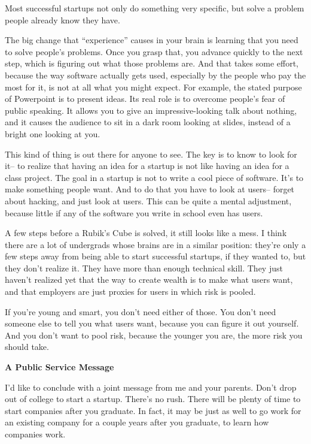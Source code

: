 \documentclass[12pt]{book}
\begin{document}
Most successful startups not only do something very specific, but solve
a problem people already know they have.

The big change that ``experience'' causes in your brain is learning that
you need to solve people's problems. Once you grasp that, you advance
quickly to the next step, which is figuring out what those problems are.
And that takes some effort, because the way software actually gets used,
especially by the people who pay the most for it, is not at all what you
might expect. For example, the stated purpose of Powerpoint is to
present ideas. Its real role is to overcome people's fear of public
speaking. It allows you to give an impressive-looking talk about
nothing, and it causes the audience to sit in a dark room looking at
slides, instead of a bright one looking at you.

This kind of thing is out there for anyone to see. The key is to know to
look for it-- to realize that having an idea for a startup is not like
having an idea for a class project. The goal in a startup is not to
write a cool piece of software. It's to make something people want. And
to do that you have to look at users-- forget about hacking, and just
look at users. This can be quite a mental adjustment, because little if
any of the software you write in school even has users.

A few steps before a Rubik's Cube is solved, it still looks like a mess.
I think there are a lot of undergrads whose brains are in a similar
position: they're only a few steps away from being able to start
successful startups, if they wanted to, but they don't realize it. They
have more than enough technical skill. They just haven't realized yet
that the way to create wealth is to make what users want, and that
employers are just proxies for users in which risk is pooled.

If you're young and smart, you don't need either of those. You don't
need someone else to tell you what users want, because you can figure it
out yourself. And you don't want to pool risk, because the younger you
are, the more risk you should take.

\textbf{A Public Service Message}

I'd like to conclude with a joint message from me and your parents.
Don't drop out of college to start a startup. There's no rush. There
will be plenty of time to start companies after you graduate. In fact,
it may be just as well to go work for an existing company for a couple
years after you graduate, to learn how companies work.
\end{document}
